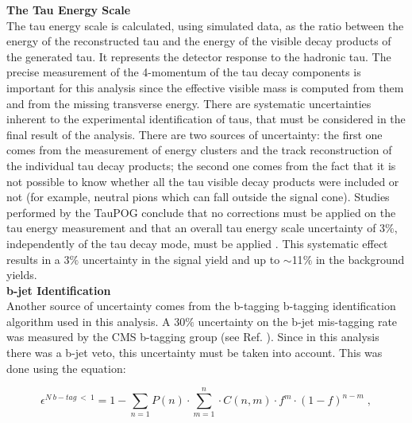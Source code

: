 
\textbf{The Tau Energy Scale}\\

\noindent The tau energy scale is calculated, using
simulated data, as the ratio between the energy of the reconstructed tau
and the energy of the visible decay products of the generated tau.
It represents the detector response to the hadronic tau. The precise 
measurement of the 4-momentum of the tau decay 
components is important for this analysis since the effective visible mass is computed from them
and from the missing transverse energy. There are systematic uncertainties 
inherent to the experimental identification of taus, that must be considered 
in the final result of the analysis. There are two sources of uncertainty: 
the first one comes from the measurement of energy clusters and 
the track reconstruction of the individual tau decay products; the second one 
comes from the fact that it is not possible to know whether all the tau visible 
decay products were included or not (for example, neutral pions which 
can fall outside the signal cone). Studies performed by the TauPOG conclude that 
no corrections must be applied on the tau energy measurement and that 
an overall tau energy scale uncertainty of 3$\%$, independently of the
tau decay mode, must be applied \cite{TauPOG}. This systematic effect
results in a 3$\%$ uncertainty in the signal yield and up to $\sim$11$\%$
in the background yields.\\


\textbf{b-jet Identification}\\

\noindent Another source of uncertainty comes from the b-tagging
b-tagging identification algorithm used in this analysis. A 30$\%$ uncertainty on the 
b-jet mis-tagging rate was measured by the CMS b-tagging group (see Ref. \cite{bjetID}). Since in this
analysis there was a b-jet veto, this uncertainty must be taken into account. This was done 
using the equation:

\begin{equation}
\epsilon^{N\ b-tag \ < \ 1} = 1 - \sum_{n = 1} P(n) \cdot \sum_{m=1}^{n} \cdot C(n,m) \cdot f^{m} \cdot (1-f)^{n-m} \; , 
\end{equation}


